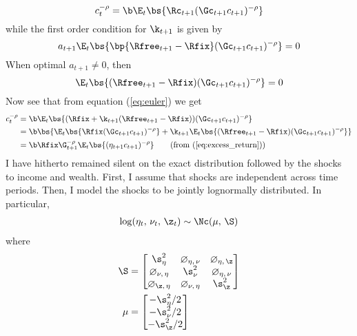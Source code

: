 \begin{equation}\label{eq:euler}
    c_t^{-\rho} = \b \E_{t}\bs{\Rc_{t+1}(\Gc_{t+1}c_{t+1})^{-\rho}}
\end{equation}
while the first order condition for $\k_{t+1}$ is given by
\begin{equation}\label{eq:excess_return}
    a_{t+1}\E_{t}\bs{\bp{\Rfree_{t+1} - \Rfix}(\Gc_{t+1}c_{t+1})^{-\rho}} = 0
\end{equation}
When optimal $a_{t+1} \neq 0$, then
\[
\E_{t}\bs{(\Rfree_{t+1} - \Rfix)(\Gc_{t+1}c_{t+1})^{-\rho}} = 0
\]
Now see that from equation (\ref{eq:euler}) we get
\begin{align*}
    c_{t}^{-\rho} &= \b \E_{t}\bs{(\Rfix + \k_{t+1}(\Rfree_{t+1} - \Rfix))(\Gc_{t+1}c_{t+1})^{-\rho}}\\
    &= \b \bs{\E_{t}\bs{\Rfix(\Gc_{t+1}c_{t+1})^{-\rho}} + \k_{t+1}\E_{t}\bs{(\Rfree_{t+1} - \Rfix)(\Gc_{t+1}c_{t+1})^{-\rho}}}\\
    &= \b\Rfix\G_{t+1}^{-\rho}\E_{t}\bs{(\eta_{t+1}c_{t+1})^{-\rho}} \tag{from (\ref{eq:excess_return})}
\end{align*}
I have hitherto remained silent on the exact distribution followed by the shocks to income and wealth. First, I assume that shocks are independent across time periods. Then, I model the shocks to be jointly lognormally distributed. In particular,
\begin{align*}
    \log (\eta_t,\,\nu_t,\,\z_t) \sim \Nc(\mu,\,\S)
\end{align*}
where
\begin{align*}
    \S &= \begin{bmatrix}
        \s_{\eta}^2 & \o_{\eta,\,\nu} & \o_{\eta,\,\z}\\
        \o_{\nu,\,\eta} & \s_{\nu}^2 & \o_{\eta,\,\nu}\\
        \o_{\z,\,\eta} & \o_{\nu,\,\eta} & \s_{\z}^2
    \end{bmatrix}\\
    \mu &= \begin{bmatrix}
        -\s_{\eta}^2 / 2\\
        -\s_{\nu}^2 / 2\\
        -\s_{\z}^2 / 2
    \end{bmatrix}
\end{align*}
